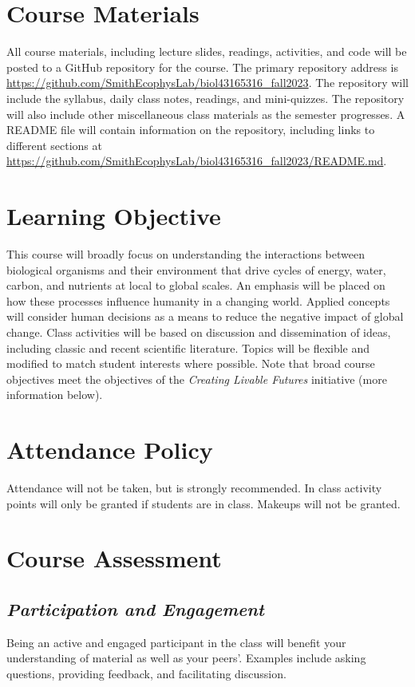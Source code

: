 \documentclass[12pt, notitlepage]{article}   	%
\begin{document}
{\section{Course Materials}
All course materials, including lecture slides, readings, activities, and code 
will be posted to a GitHub repository for the course.
The primary repository address is
\url{https://github.com/SmithEcophysLab/biol43165316_fall2023}.
The repository will include the syllabus, daily class notes, readings, and mini-quizzes.
The repository will also include other miscellaneous class materials as the semester
progresses. A README file will contain information on the repository, including
links to different sections at 
\url{https://github.com/SmithEcophysLab/biol43165316_fall2023/README.md}.

\section{Learning Objective}
This course will broadly focus on understanding the interactions between biological
organisms and their environment that drive cycles of energy, water, carbon, and nutrients
at local to global scales.
An emphasis will be placed on how these processes influence humanity in a changing world.
Applied concepts will consider human decisions as a means to reduce the negative impact
of global change. Class activities will be based on discussion and dissemination of ideas, 
including classic and recent scientific literature. 
Topics will be flexible and modified to match student interests where possible.
Note that broad course objectives meet the objectives of the \textit{Creating Livable Futures}
initiative (more information below).

\section{Attendance Policy}
Attendance will not be taken, but is strongly recommended. 
In class activity points will only be granted if students are in class.
Makeups will not be granted.

\section{Course Assessment}
\subsection{\textit{Participation and Engagement}}
Being an active and engaged participant in the class will benefit your understanding
of material as well as your peers'. Examples include asking questions, providing feedback,
and facilitating discussion.

}
\end{document}
